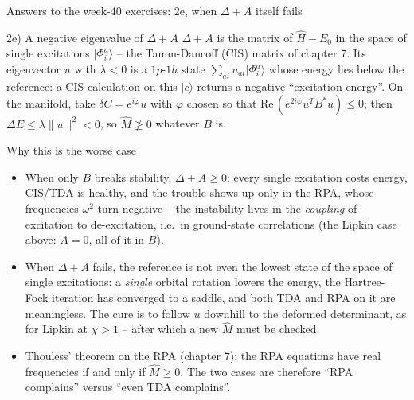 \documentclass[aspectratio=169,10pt]{beamer}
\newcommand{\ket}[1]{\vert #1\rangle}
\begin{document}
\begin{frame}{Answers to the week-40 exercises: 2e, when $\Delta+A$ itself fails}
  \footnotesize
  \begin{block}{2e) A negative eigenvalue of $\Delta+A$}
    $\Delta+A$ is the matrix of $\hat H-E_0$ in the space of single excitations $\ket{\Phi_i^a}$ -- the Tamm-Dancoff (CIS) matrix of chapter 7. Its eigenvector $u$ with $\lambda<0$ is a $1p$-$1h$ state $\sum_{ai}u_{ai}\ket{\Phi_i^a}$ whose energy lies \alert{below the reference}: a CIS calculation on this $\ket c$ returns a negative ``excitation energy''. On the manifold, take $\delta C=e^{i\varphi}u$ with $\varphi$ chosen so that $\mathrm{Re}\,(e^{2i\varphi}u^{T}B^{*}u)\le0$; then $\Delta E\le\lambda\|u\|^2<0$, so $\hat M\not\ge0$ whatever $B$ is.
  \end{block}
  \begin{block}{Why this is the worse case}
    \begin{itemize}
      \item When only $B$ breaks stability, $\Delta+A\ge0$: every single excitation costs energy, CIS/TDA is healthy, and the trouble shows up only in the RPA, whose frequencies $\omega^2$ turn negative -- the instability lives in the \emph{coupling} of excitation to de-excitation, i.e.\ in ground-state correlations (the Lipkin case above: $A=0$, all of it in $B$).
      \item When $\Delta+A$ fails, the reference is not even the lowest state of the space of single excitations: a \emph{single} orbital rotation lowers the energy, the Hartree-Fock iteration has converged to a saddle, and both TDA and RPA on it are meaningless. The cure is to follow $u$ downhill to the deformed determinant, as for Lipkin at $\chi>1$ -- after which a new $\hat M$ must be checked.
      \item Thouless' theorem on the RPA (chapter 7): the RPA equations have real frequencies if and only if $\hat M\ge0$. The two cases are therefore ``RPA complains'' versus ``even TDA complains''.
    \end{itemize}
  \end{block}
\end{frame}
\end{document}
